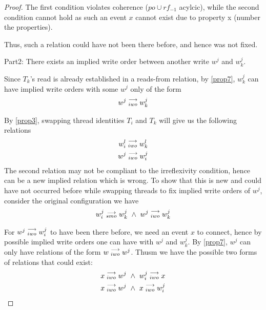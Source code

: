 \begin{proof}
                The first condition violates coherence ($po \cup rf_{-1}$ acylcic), while the second condition cannot hold as such an event $x$ cannot exist due to property x (number the properties).
                
                Thus, such a relation could have not been there before, and hence was not fixed. 


                Part2: There exists an implied write order between another write $w^j$ and $w_k^j$.

                Since $T_k$'s read is already established in a reads-from relation, by \ref{prop7}, $w_k^j$ can have implied write orders with some $w^j$ only of the form 
                \begin{align}
                    w^j\stackrel{\longrightarrow}{_{iwo}}w_k^j
                \end{align}

                By \ref{prop3}, swapping thread identities $T_i$ and $T_k$ will give us the following relations 
                \begin{align}
                    w_i^l\stackrel{\longrightarrow}{_{iwo}}w_k^l \\ 
                    w^j\stackrel{\longrightarrow}{_{iwo}}w_i^j 
                \end{align}
                The second relation may not be compliant to the irreflexivity condition, hence can be a new implied relation which is wrong. To show that this is new and could have not occurred before while swapping threads to fix implied write orders of $w^j$, consider the original configuration we have 
                \begin{align}
                    \reln{w_i^j}{smo}{w_k^j} \ \wedge \ \reln{w^j}{iwo}{w_k^j}
                \end{align}

                For $w^j\stackrel{\longrightarrow}{_{iwo}}w_i^j$ to have been there before, we need an event $x$ to connect, hence by possible implied write orders one can have with $w^j$ and $w_k^j$. By \ref{prop7}, $w^j$ can only have relations of the form $w\stackrel{\longrightarrow}{_{iwo}}w^j$. Thusm we have the possible two forms of relations that could exist:
                \begin{align}
                    x\stackrel{\longrightarrow}{_{iwo}}w^j \ \wedge \ w_i^j\stackrel{\longrightarrow}{_{iwo}}x \\
                    x\stackrel{\longrightarrow}{_{iwo}}w^j \ \wedge \ x\stackrel{\longrightarrow}{_{iwo}}w_i^j \\ 
                \end{align}


\end{proof}
